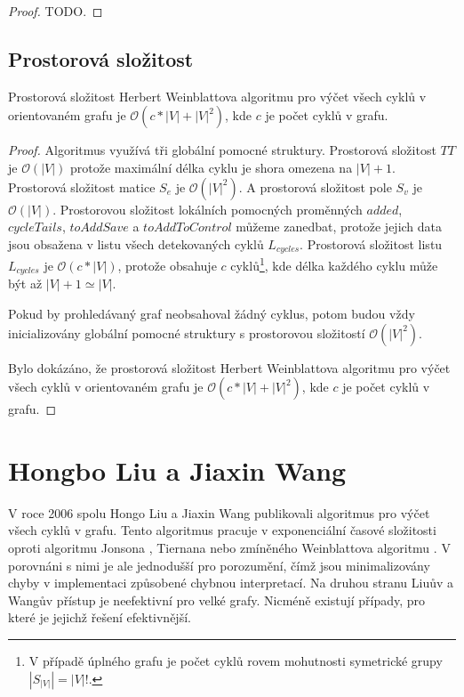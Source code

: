         \begin{proof}
            TODO.
        \end{proof}

    \section{Prostorová složitost}
        \begin{theorem}
            Prostorová složitost Herbert Weinblattova algoritmu pro výčet všech cyklů v orientovaném grafu je $\mathcal{O}(c * |V| + |V|^2)$, kde $c$ je počet cyklů v grafu.
        \end{theorem}

        \begin{proof}
            Algoritmus využívá tři globální pomocné struktury. Prostorová složitost $TT$ je $\mathcal{O}(|V|)$ protože maximální délka cyklu je shora omezena na $|V| + 1$. Prostorová složitost matice $S_e$ je $\mathcal{O}(|V|^2)$. A prostorová složitost pole $S_v$ je $\mathcal{O}(|V|)$. Prostorovou složitost lokálních pomocných proměnných $added$, $cycleTails$, $toAddSave$ a $toAddToControl$ můžeme zanedbat, protože jejich data jsou obsažena v listu všech detekovaných cyklů $L_{cycles}$. Prostorová složitost listu $L_{cycles}$ je $\mathcal{O}(c * |V|)$, protože obsahuje $c$ cyklů\footnote{V případě úplného grafu je počet cyklů rovem mohutnosti symetrické grupy $|S_{|V|}| = |V|!$.}, kde délka každého cyklu může být až $|V| + 1 \simeq |V|$.

            Pokud by prohledávaný graf neobsahoval žádný cyklus, potom budou vždy inicializovány globální pomocné struktury s prostorovou složitostí $\mathcal{O}(|V|^2)$.

            Bylo dokázáno, že prostorová složitost Herbert Weinblattova algoritmu pro výčet všech cyklů v orientovaném grafu je $\mathcal{O}(c * |V| + |V|^2)$, kde $c$ je počet cyklů v grafu.
        \end{proof}

\chapter{Hongbo Liu a Jiaxin Wang}
    \label{chapter:Algo3}
    V roce 2006 spolu Hongo Liu a Jiaxin Wang publikovali algoritmus \cite{A_new_way_to_enumerate_cycles_in_graph} pro výčet všech cyklů v grafu. Tento algoritmus pracuje v exponenciální časové složitosti oproti algoritmu Jonsona \cite{Johnson_1975}, Tiernana \cite{Tiernan} nebo zmíněného Weinblattova algoritmu \cite{A_new_search_algorithm}. V porovnáni s nimi je ale jednodušší pro porozumění, čímž jsou minimalizovány chyby v implementaci způsobené chybnou interpretací. Na druhou stranu Liuův a Wangův přístup je neefektivní pro velké grafy. Nicméně existují případy, pro které je jejichž řešení efektivnější.

